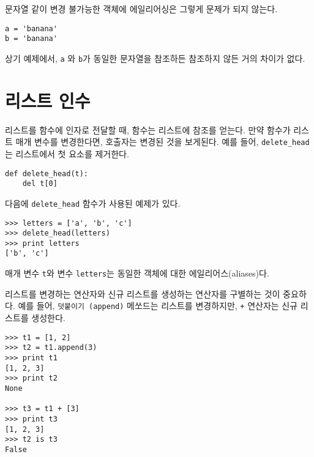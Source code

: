 
문자열 같이 변경 불가능한 객체에 에일리어싱은 그렇게 문제가 되지 않는다. 

\beforeverb
\begin{verbatim}
a = 'banana'
b = 'banana'
\end{verbatim}
\afterverb
%

상기 예제에서, {\tt a} 와 {\tt b}가 동일한 문자열을 참조하든 참조하지 않든 거의 차이가 없다.

\section{리스트 인수}


리스트를 함수에 인자로 전달할 때, 함수는 리스트에 참조를 얻는다. 
만약 함수가 리스트 매개 변수를 변경한다면, 호출자는 변경된 것을 보게된다.
예를 들어, \verb"delete_head"는 리스트에서 첫 요소를 제거한다.

\beforeverb
\begin{verbatim}
def delete_head(t):
    del t[0]
\end{verbatim}
\afterverb
%

다음에 \verb"delete_head" 함수가 사용된 예제가 있다.

\beforeverb
\begin{verbatim}
>>> letters = ['a', 'b', 'c']
>>> delete_head(letters)
>>> print letters
['b', 'c']
\end{verbatim}
\afterverb
%

매개 변수 {\tt t}와 변수 {\tt letters}는 동일한 객체에 대한 에일리어스(aliases)다.

리스트를 변경하는 연산자와 신규 리스트를 생성하는 연산자를 구별하는 것이 중요하다.
예를 들어, {\tt 덧붙이기 (append)} 메쏘드는 리스트를 변경하지만, {\tt +} 연산자는 신규 리스트를 생성한다.


\beforeverb
\begin{verbatim}
>>> t1 = [1, 2]
>>> t2 = t1.append(3)
>>> print t1
[1, 2, 3]
>>> print t2
None

>>> t3 = t1 + [3]
>>> print t3
[1, 2, 3]
>>> t2 is t3
False
\end{verbatim}
\afterverb

